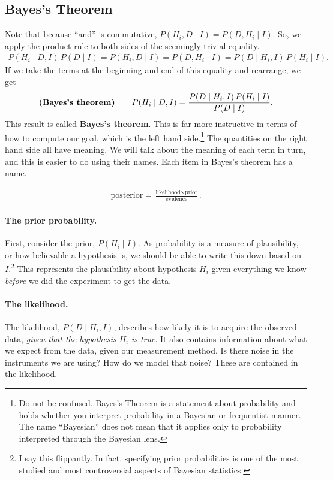 \subsection{Bayes's Theorem}
Note that because ``and'' is commutative,
$P(H_i, D \mid I) = P(D, H_i \mid I)$.  So, we apply the product
rule to both sides of the seemingly trivial equality.
\begin{align}
  P(H_i \mid D, I)\, P(D \mid I) =  P(H_i, D \mid I)
  = P(D, H_i \mid I) = P(D \mid H_i, I)\, P(H_i \mid I).
\end{align}
If we take the terms at the beginning and end of this equality and
rearrange, we get
\begin{align}
\text{\textbf{(Bayes's theorem)}} \qquad  P(H_i \mid D, I) = \frac{P(D \mid H_i, I)\, P(H_i \mid I)}{P(D \mid I)}.
\end{align}
This result is called \textbf{Bayes's theorem}.  This is far more
instructive in terms of how to compute our goal, which is the left
hand side.\footnote{Do not be confused. Bayes's Theorem is a statement about probability and holds whether you interpret probability in a Bayesian or frequentist manner. The name ``Bayesian'' does not mean that it applies only to probability interpreted through the Bayesian lens.}  The quantities on the right hand side all have meaning.
We will talk about the meaning of each term in turn, and this is
easier to do using their names.  Each item in Bayes's theorem has a
name.

\begin{align}
\text{posterior} = \frac{\text{likelihood} \times \text{prior}}{\text{evidence}}.
\end{align}

\paragraph{The prior probability.}  First, consider the prior,
$P(H_i \mid I)$.  As probability is a measure of plausibility, or how
believable a hypothesis is, we should be able to write this down based
on $I$.\footnote{I say this flippantly.  In fact, specifying prior
  probabilities is one of the most studied and most controversial
  aspects of Bayesian statistics.}  This represents the
plausibility about hypothesis $H_i$ given everything we know
\textit{before} we did the experiment to get the data.

\paragraph{The likelihood.}
The likelihood, $P(D\mid H_i,I)$, describes how likely it is to
acquire the observed data, \textit{given that the hypothesis} $H_i$
\textit{is true}.  It also contains information about what we expect
from the data, given our measurement method.  Is there noise in the
instruments we are using?  How do we model that noise?  These are
contained in the likelihood.

